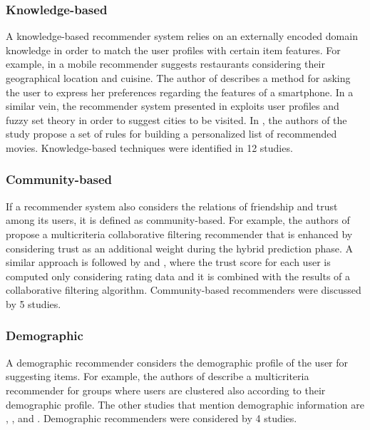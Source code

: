 \subsubsection{Knowledge-based}

A knowledge-based recommender system relies on an externally encoded domain knowledge in order to match the user profiles with certain item features. For example, in  a mobile recommender suggests restaurants considering their geographical location and cuisine. The author of  describes a method for asking the user to express her preferences regarding the features of a smartphone. In a similar vein, the recommender system presented in  exploits user profiles and fuzzy set theory in order to suggest cities to be visited. In , the authors of the study propose a set of rules for building a personalized list of recommended movies. Knowledge-based techniques were identified in 12 studies.

\subsubsection{Community-based}

If a recommender system also considers the relations of friendship and trust among its users, it is defined as community-based. For example, the authors of  propose a multicriteria collaborative filtering recommender that is enhanced by considering trust as an additional weight during the hybrid prediction phase. A similar approach is followed by  and , where the trust score for each user is computed only considering rating data and it is combined with the results of a collaborative filtering algorithm. Community-based recommenders were discussed by 5 studies.

\subsubsection{Demographic}

A demographic recommender considers the demographic profile of the user for suggesting items. For example, the authors of  describe a multicriteria recommender for groups where users are clustered also according to their demographic profile. The other studies that mention demographic information are , , and . Demographic recommenders were considered by 4 studies.

